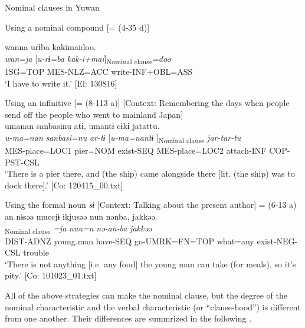 \ea\label{ex:11-4}  Nominal clauses in Yuwan

  \ea Using a nominal compound [= (4-35 d)]
  
      \glll    wanna  urɨba  kakimaidoo.\\
    \textit{wan=ja}  [\textit{u-rɨ=ba}  \textit{kak-i+mai}]\textsubscript{Nominal clause}\textit{=doo}\\
    1SG=TOP  MES-NLZ=ACC  write-INF+OBL=ASS\\
    \glt     ‘I have to write it.’ [El: 130816]

  \ex Using an infinitive [= (8-113 a)]  [Context: Remembering the days when people send off the people who went to mainland Japan]\\
  
      \glll    umanan  sanbasinu  atɨ,  umantɨ  cɨkɨ  jatattu.\\
    \textit{u-ma=nan}  \textit{sanbasi=nu}  \textit{ar-tɨ}    [\textit{u-ma=nantɨ}  \textit{}]\textsubscript{Nominal clause}  \textit{jar-tar-tu}\\
    MES-place=LOC1  pier=NOM  exist-SEQ  MES-place=LOC2  attach-INF  COP-PST-CSL\\    
    \glt  ‘There is a pier there, and (the ship) came alongside there [lit. (the ship) was to dock there].’    [Co: 120415\_00.txt]

  \ex Using the formal noun \textit{sɨ}   [Context: Talking about the present author] = (6-13 a)\\
  
      \glll    an  nɨsəə  muccjɨ  ikjusəə  nun   nənba,  jakkəə.\\
    [\textit{a-n}  \textit{nəɨsəə}  \textit{mut-tɨ}  \textit{\Highlight{ik-jur=sɨ}}]\textsubscript{Nominal clause} \textit{=ja}  \textit{nuu=n}   \textit{nə-an-ba}  \textit{jakkəə}\\
    DIST-ADNZ  young.man  have-SEQ  go-UMRK=FN=TOP  what=any  exist-NEG-CSL  trouble\\
    \glt    ‘There is not anything [i.e. any food] the young man can take (for meals), so it’s pity.’    [Co: 101023\_01.txt]
\z
\z

All of the above strategies can make the nominal clause, but the degree of the nominal characteristic and the verbal characteristic (or “clause-hood”) is different from one another. Their differences are summrized in the following .

